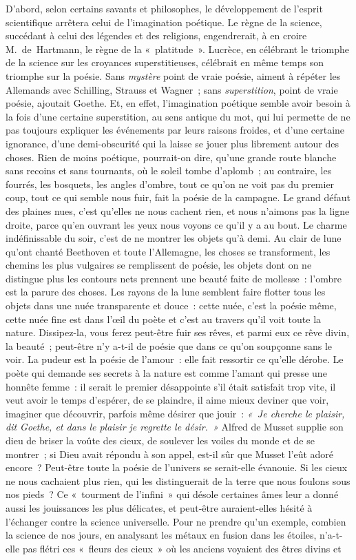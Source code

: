 \documentclass[french,twoside]{book} %
\begin{document}
D’abord, selon certains savants et philosophes, le développement de l’esprit scientifique arrêtera celui de l’imagination poétique. Le règne de la science, succédant à celui des légendes et des religions, engendrerait, à en croire M. de Hartmann, le règne de la « platitude ». Lucrèce, en célébrant le triomphe de la science sur les croyances superstitieuses, célébrait en même temps son triomphe sur la poésie. Sans \emph{mystère} point de vraie poésie, aiment à répéter les Allemands avec Schilling, Strauss et Wagner ; sans \emph{superstition}, point de vraie poésie, ajoutait Goethe. Et, en effet,  l’imagination poétique semble avoir besoin à la fois d’une certaine superstition, au sens antique du mot, qui lui permette de ne pas toujours expliquer les événements par leurs raisons froides, et d’une certaine ignorance, d’une demi-obscurité qui la laisse se jouer plus librement autour des choses. Rien de moins poétique, pourrait-on dire, qu’une grande route blanche sans recoins et sans tournants, où le soleil tombe d’aplomb ; au contraire, les fourrés, les bosquets, les angles d’ombre, tout ce qu’on ne voit pas du premier coup, tout ce qui semble nous fuir, fait la poésie de la campagne. Le grand défaut des plaines nues, c’est qu’elles ne nous cachent rien, et nous n’aimons pas la ligne droite, parce qu’en ouvrant les yeux nous voyons ce qu’il y a au bout. Le charme indéfinissable du soir, c’est de ne montrer les objets qu’à demi. Au clair de lune qu’ont chanté Beethoven et toute l’Allemagne, les choses se transforment, les chemins les plus vulgaires se remplissent de poésie, les objets dont on ne distingue plus les contours nets prennent une beauté faite de mollesse : l’ombre est la parure des choses. Les rayons de la lune semblent faire flotter tous les objets dans une nuée transparente et douce : cette nuée, c’est la poésie même, cette nuée fine est dans l’œil du poète et c’est au travers qu’il voit toute la nature. Dissipez-la, vous ferez peut-être fuir ses rêves, et parmi eux ce rêve divin, la beauté ; peut-être n’y a-t-il de poésie que dans ce qu’on soupçonne sans le voir. La pudeur est la poésie de l’amour : elle fait ressortir ce qu’elle dérobe. Le poète qui demande ses secrets à la nature est comme l’amant qui presse une  honnête femme : il serait le premier désappointe s’il était satisfait trop vite, il veut avoir le temps d’espérer, de se plaindre, il aime mieux deviner que voir, imaginer que découvrir, parfois même désirer que jouir : \emph{« Je cherche le plaisir, dit Goethe, et dans le plaisir je regrette le désir. »} Alfred de Musset supplie son dieu de briser la voûte des cieux, de soulever les voiles du monde et de se montrer ; si Dieu avait répondu à son appel, est-il sûr que Musset l’eût adoré encore ? Peut-être toute la poésie de l’univers se serait-elle évanouie. Si les cieux ne nous cachaient plus rien, qui les distinguerait de la terre que nous foulons sous nos pieds ? Ce « tourment de l’infini » qui désole certaines âmes leur a donné aussi les jouissances les plus délicates, et peut-être auraient-elles hésité à l’échanger contre la science universelle. Pour ne prendre qu’un exemple, combien la science de nos jours, en analysant les métaux en fusion dans les étoiles, n’a-t-elle pas flétri ces « fleurs des cieux » où les anciens voyaient des êtres divins et 
\end{document}

